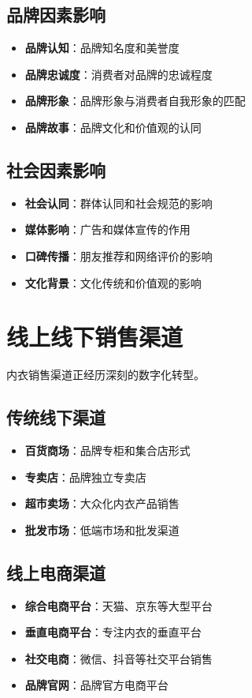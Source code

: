 \documentclass[12pt,UTF8]{ctexbook}
\begin{document}
\subsection{品牌因素影响}
\begin{itemize}[leftmargin=2cm]
	\item \textbf{品牌认知}：品牌知名度和美誉度
	\item \textbf{品牌忠诚度}：消费者对品牌的忠诚程度
	\item \textbf{品牌形象}：品牌形象与消费者自我形象的匹配
	\item \textbf{品牌故事}：品牌文化和价值观的认同
\end{itemize}

\subsection{社会因素影响}
\begin{itemize}[leftmargin=2cm]
	\item \textbf{社会认同}：群体认同和社会规范的影响
	\item \textbf{媒体影响}：广告和媒体宣传的作用
	\item \textbf{口碑传播}：朋友推荐和网络评价的影响
	\item \textbf{文化背景}：文化传统和价值观的影响
\end{itemize}

\section{线上线下销售渠道}
内衣销售渠道正经历深刻的数字化转型。

\subsection{传统线下渠道}
\begin{itemize}[leftmargin=2cm]
	\item \textbf{百货商场}：品牌专柜和集合店形式
	\item \textbf{专卖店}：品牌独立专卖店
	\item \textbf{超市卖场}：大众化内衣产品销售
	\item \textbf{批发市场}：低端市场和批发渠道
\end{itemize}

\subsection{线上电商渠道}
\begin{itemize}[leftmargin=2cm]
	\item \textbf{综合电商平台}：天猫、京东等大型平台
	\item \textbf{垂直电商平台}：专注内衣的垂直平台
	\item \textbf{社交电商}：微信、抖音等社交平台销售
	\item \textbf{品牌官网}：品牌官方电商平台
\end{itemize}
\end{document}
